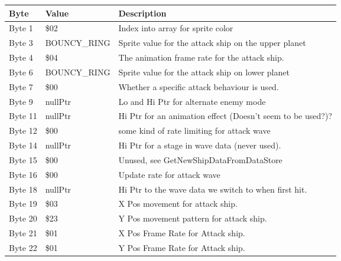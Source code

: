 \begin{figure}[H]
{\begin{adjustbox}{width=12cm}
\begin{tabular}{lll}
\toprule
 Byte    & Value                     & Description                                                        \\
\midrule
 Byte 1  & \$02                       & Index into array for sprite color                                  \\
 Byte 3  & BOUNCY\_RING               & Sprite value for the attack ship on the upper planet               \\
 Byte 4  & \$04                       & The animation frame rate for the attack ship.                      \\
 Byte 6  & BOUNCY\_RING               & Sprite value for the attack ship on lower planet                   \\
 Byte 7  & \$00                       & Whether a specific attack behaviour is used.                       \\
 Byte 9  & nullPtr                   & Lo and Hi Ptr for alternate enemy mode                             \\
 Byte 11 & nullPtr                   & Hi Ptr for an animation effect (Doesn't seem to be used?)?         \\
 Byte 12 & \$00                       & some kind of rate limiting for attack wave                         \\
 Byte 14 & nullPtr                   & Hi Ptr for a stage in wave data (never used).                      \\
 Byte 15 & \$00                       & Unused, see GetNewShipDataFromDataStore                            \\
 Byte 16 & \$00                       & Update rate for attack wave                                        \\
 Byte 18 & nullPtr                   & Hi Ptr to the wave data we switch to when first hit.               \\
 Byte 19 & \$03                       & X Pos movement for attack ship.                                    \\
 Byte 20 & \$23                       & Y Pos movement pattern for attack ship.                            \\
 Byte 21 & \$01                       & X Pos Frame Rate for Attack ship.                                  \\
 Byte 22 & \$01                       & Y Pos Frame Rate for Attack ship.                                  \\

\end{tabular}
\end{adjustbox}}
\end{figure}
